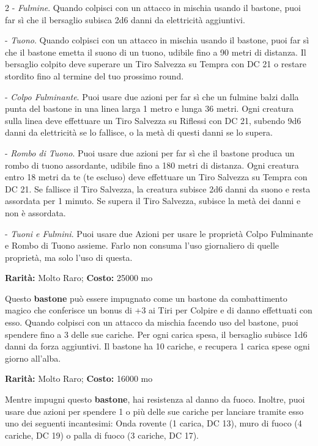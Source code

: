 \begin{multicols}{2}
- \emph{Fulmine}. Quando colpisci con un attacco in mischia usando il bastone, puoi far sì che il bersaglio subisca 2d6 danni da elettricità aggiuntivi.

- \emph{Tuono}. Quando colpisci con un attacco in mischia usando il bastone, puoi far sì che il bastone emetta il suono di un tuono, udibile fino a 90 metri di distanza. Il bersaglio colpito deve superare un Tiro Salvezza su Tempra con DC 21 o restare stordito fino al termine del tuo prossimo round.

- \emph{Colpo Fulminante}. Puoi usare due azioni per far sì che un fulmine balzi dalla punta del bastone in una linea larga 1 metro e lunga 36 metri. Ogni creatura sulla linea deve effettuare un Tiro Salvezza su Riflessi con DC 21, subendo 9d6 danni da elettricità se lo fallisce, o la metà di questi danni se lo supera.

- \emph{Rombo di Tuono}. Puoi usare due azioni per far sì che il bastone produca un rombo di tuono assordante, udibile fino a 180 metri di distanza. Ogni creatura entro 18 metri da te (te escluso) deve effettuare un Tiro Salvezza su Tempra con DC 21. Se fallisce il Tiro Salvezza, la creatura subisce 2d6 danni da suono e resta assordata per 1 minuto. Se supera il Tiro Salvezza, subisce la metà dei danni e non è assordata.

- \emph{Tuoni e Fulmini}. Puoi usare due Azioni per usare le proprietà Colpo Fulminante e Rombo di Tuono assieme. Farlo non consuma l'uso giornaliero di quelle proprietà, ma solo l'uso di questa.


\textbf{Rarità:} Molto Raro; \textbf{Costo:} 25000 mo

Questo \textbf{bastone} può essere impugnato come un bastone da combattimento magico che conferisce un bonus di +3 ai Tiri per Colpire e di danno effettuati con esso. Quando colpisci con un attacco da mischia facendo uso del bastone, puoi spendere fino a 3 delle sue cariche. Per ogni carica spesa, il bersaglio subisce 1d6 danni da forza aggiuntivi. Il bastone ha 10 cariche, e recupera 1 carica spese ogni giorno all'alba.


\textbf{Rarità:} Molto Raro; \textbf{Costo:} 16000 mo

Mentre impugni questo \textbf{bastone}, hai resistenza al danno da fuoco.
Inoltre, puoi usare due azioni per spendere 1 o più delle sue cariche per lanciare tramite esso uno dei seguenti incantesimi: Onda rovente (1 carica, DC 13), muro di fuoco (4 cariche, DC 19) o palla di fuoco (3 cariche, DC 17).


\end{multicols}
